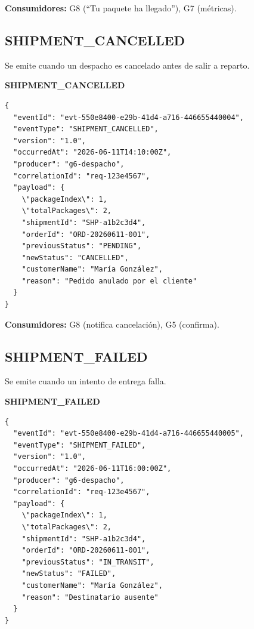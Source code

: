 \documentclass[11pt, a4paper]{article}
\newcommand{\contractheader}[1]{%
  \noindent\colorbox{primary!10}{%
    \parbox{\dimexpr\textwidth-2\fboxsep}{%
      \textbf{\faFileCode\quad #1}%
    }%
  }
  \vspace{0.3cm}
}
\begin{document}
\textbf{Consumidores:} G8 (``Tu paquete ha llegado''), G7 (métricas).

\vspace{0.4cm}

\subsection{SHIPMENT\_CANCELLED}

Se emite cuando un despacho es cancelado antes de salir a reparto.

\contractheader{SHIPMENT\_CANCELLED}

\begin{lstlisting}
{
  "eventId": "evt-550e8400-e29b-41d4-a716-446655440004",
  "eventType": "SHIPMENT_CANCELLED",
  "version": "1.0",
  "occurredAt": "2026-06-11T14:10:00Z",
  "producer": "g6-despacho",
  "correlationId": "req-123e4567",
  "payload": {
    \"packageIndex\": 1,
    \"totalPackages\": 2,
    "shipmentId": "SHP-a1b2c3d4",
    "orderId": "ORD-20260611-001",
    "previousStatus": "PENDING",
    "newStatus": "CANCELLED",
    "customerName": "María González",
    "reason": "Pedido anulado por el cliente"
  }
}
\end{lstlisting}

\textbf{Consumidores:} G8 (notifica cancelación), G5 (confirma).

\vspace{0.4cm}

\subsection{SHIPMENT\_FAILED}

Se emite cuando un intento de entrega falla.

\contractheader{SHIPMENT\_FAILED}

\begin{lstlisting}
{
  "eventId": "evt-550e8400-e29b-41d4-a716-446655440005",
  "eventType": "SHIPMENT_FAILED",
  "version": "1.0",
  "occurredAt": "2026-06-11T16:00:00Z",
  "producer": "g6-despacho",
  "correlationId": "req-123e4567",
  "payload": {
    \"packageIndex\": 1,
    \"totalPackages\": 2,
    "shipmentId": "SHP-a1b2c3d4",
    "orderId": "ORD-20260611-001",
    "previousStatus": "IN_TRANSIT",
    "newStatus": "FAILED",
    "customerName": "María González",
    "reason": "Destinatario ausente"
  }
}
\end{lstlisting}
\end{document}
